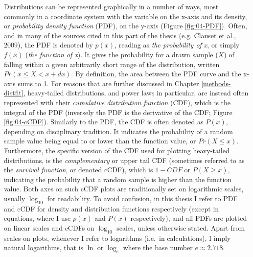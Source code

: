 \documentclass[
  12pt,
]{book}
\begin{document}
Distributions can be represented graphically in a number of ways, most commonly in a coordinate system with the variable on the x-axis and its density, or \emph{probability density function} (PDF), on the y-axis (Figure \ref{fig:04-PDF}). Often, and in many of the sources cited in this part of the thesis (e.g. Clauset et al., 2009), the PDF is denoted by \(p(x)\), reading as \emph{the probability of x}, or simply \(f(x)\) (\emph{the function of x}). It gives the probability for a drawn sample (\(X\)) of falling within a given arbitrarily short range of the distribution, written \(Pr(x \le X < x+dx)\). By definition, the area between the PDF curve and the x-axis sums to 1. For reasons that are further discussed in Chapter \ref{methods-distfit}, heavy-tailed distributions, and power laws in particular, are instead often represented with their \emph{cumulative distribution function} (CDF), which is the integral of the PDF (inversely the PDF is the derivative of the CDF; Figure \ref{fig:04-cCDF}). Similarly to the PDF, the CDF is often denoted as \(P(x)\), depending on disciplinary tradition. It indicates the probability of a random sample value being equal to or lower than the function value, or \(Pr(X \le x)\). Furthermore, the specific version of the CDF used for plotting heavy-tailed distributions, is the \emph{complementary} or upper tail CDF (sometimes referred to as the \emph{survival function}, or denoted cCDF), which is \(1-CDF\) or \(P(X \ge x)\), indicating the probability that a random sample is higher than the function value. Both axes on such cCDF plots are traditionally set on logarithmic scales, usually \(\log_{10}\) for readability. To avoid confusion, in this thesis I refer to PDF and cCDF for density and distribution functions respectively (except in equations, where I use \(p(x)\) and \(P(x)\) respectively), and all PDFs are plotted on linear scales and cCDFs on \(\log_{10}\) scales, unless otherwise stated. Apart from scales on plots, whenever I refer to logarithms (i.e.~in calculations), I imply natural logarithms, that is \(\ln\) or \(\log_e\) where the base number \(e \approx 2.718\).
\end{document}
